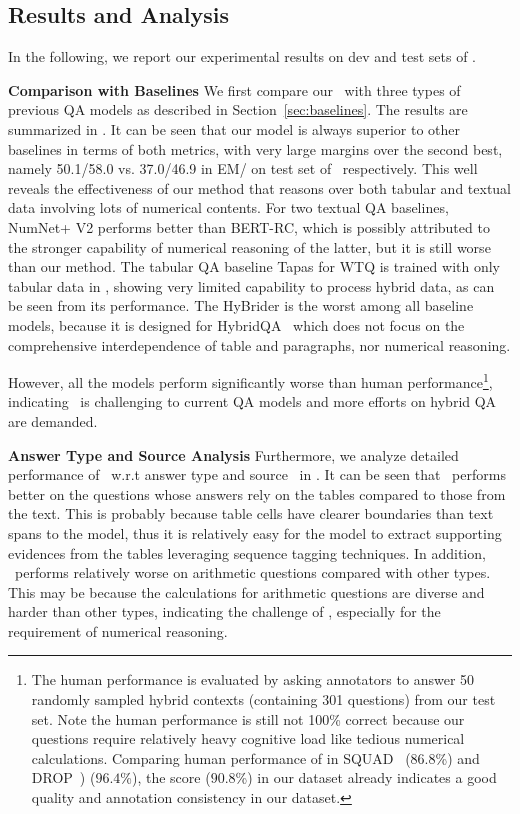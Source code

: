 \subsection{Results and Analysis}

In the following, we report our experimental results on dev and test sets of \finqa.

\noindent \textbf{Comparison with Baselines}
We first compare our \tagop~with three types of previous QA models as described in Section~\ref{sec:baselines}.
The results are summarized in .
It can be seen that our model is always superior to other baselines in terms of both metrics, with very large margins over the second best, namely  50.1/58.0 vs. 37.0/46.9 in EM/\fone{} on test set of \finqa~respectively.
This well reveals the effectiveness of our method that reasons over both tabular and textual data involving lots of numerical contents. 
For two textual QA baselines, NumNet+ V2 performs better than BERT-RC, which is possibly attributed to the stronger capability of numerical reasoning of the latter, but it is still worse than our method.
The tabular QA baseline Tapas for WTQ is trained with only tabular data in \finqa, showing very limited capability to process hybrid data, as can be seen from its performance.
The HyBrider is the worst among all baseline models, because it is designed for HybridQA~\citep{chen2020hybridqa} which does not focus on the comprehensive interdependence of table and paragraphs, nor  numerical reasoning.


However, all the models perform significantly worse than human performance\footnote{The human performance is evaluated by asking annotators to answer 50 randomly sampled hybrid contexts (containing 301 questions) from our test set. 
Note the human performance is still not 100\% correct because our questions require relatively heavy cognitive load like tedious numerical calculations. Comparing human performance of \fone{} in SQUAD~\citep{Rajpurkar2016SQuAD} ($86.8$\%) and DROP~\citep{Dua2019DROP}) ($96.4$\%), the score ($90.8$\%) in our dataset already indicates a good quality and annotation consistency in our dataset.}, indicating \finqa~is challenging to current QA models and more efforts on hybrid QA are demanded.

\noindent \textbf{Answer Type and Source Analysis}
Furthermore, we analyze detailed performance of \tagop~w.r.t answer type and source ~in .
It can be seen that \tagop~performs better on the questions whose answers rely on the tables compared to those from the text.
This is probably because table cells have clearer boundaries than text spans to the model, thus it is relatively easy for the model to extract supporting evidences from the tables leveraging sequence tagging techniques.
In addition, \tagop~performs relatively worse on arithmetic questions compared with other types.
This may be because the calculations for arithmetic questions are diverse and harder than other types, indicating the challenge of \finqa, especially for the requirement of numerical reasoning.


